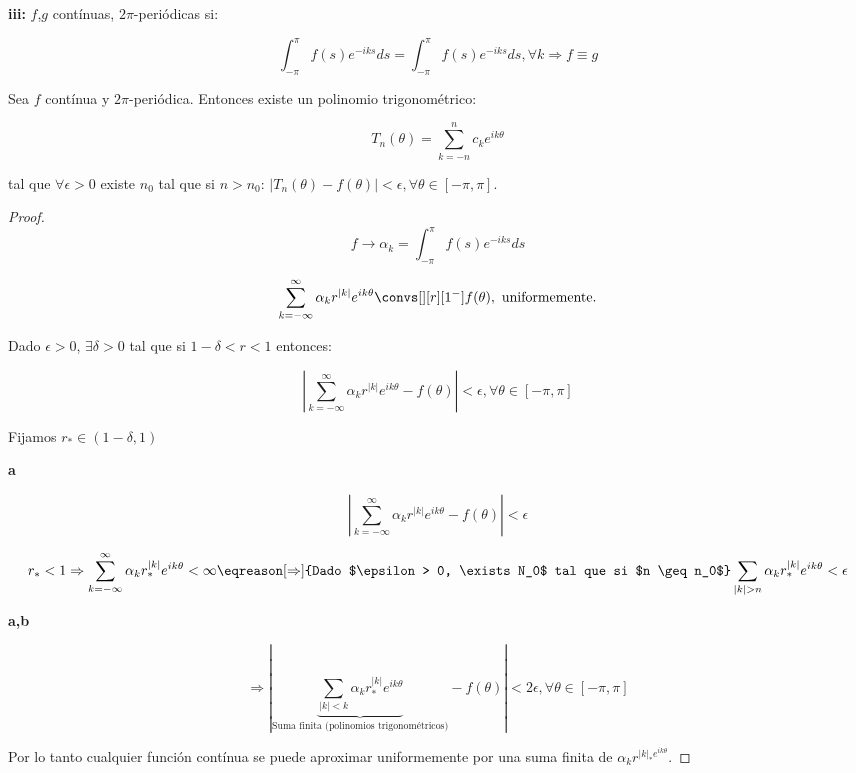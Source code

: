 		\textbf{iii:} $f$,$g$ contínuas, $2\pi$-periódicas si:

		\[ \int_{-\pi}^{\pi} f(s) e^{-iks}ds =
		 \int_{-\pi}^{\pi} f(s) e^{-iks}ds,  \forall k \Rightarrow f \equiv g \]

		\begin{theorem} \label{thm:AproxWeierstrass1} Sea $f$ contínua y $2\pi$-periódica. Entonces existe un polinomio trigonométrico:

		\[T_n (\theta) = \sum_{k = -n}^n c_k e^{ik\theta} \]

		tal que $\forall \epsilon > 0$ existe $n_0$ tal que si $n > n_0$: $|T_n (\theta) - f(\theta)| < \epsilon, \forall \theta \in [-\pi,\pi]$.
		\end{theorem}

		\begin{proof}

			\[f \rightarrow \alpha_k = \int_{-\pi}^\pi f(s) e^{-iks} ds  \]

			\[ \sum_{k=-\infty}^{\infty} \alpha_k r^{|k|} e^{ik\theta} \convs[][r][1^-] f(\theta), \text{ uniformemente.} \]

			Dado $\epsilon > 0$, $\exists \delta > 0$ tal que si $1-\delta < r < 1$ entonces:

			\[ \left| \sum_{k=-\infty}^{\infty} \alpha_k r^{|k|} e^{ik\theta} - f(\theta) \right| < \epsilon, \forall \theta \in [-\pi,\pi]  \]

			Fijamos $r_{*} \in (1-\delta, 1)$

			\textbf{a}

			\[ \left| \sum_{k=-\infty}^{\infty} \alpha_k r^{|k|} e^{ik\theta} - f(\theta) \right| < \epsilon \]

			\[  r_* < 1 \Rightarrow \sum_{k=-\infty}^\infty \alpha_k r_*^{|k|} e^{ik\theta} < \infty \eqreason[\Rightarrow]{Dado $\epsilon > 0, \exists N_0$ tal que si $n \geq n_0$} \sum_{|k| > n} \alpha_k r_*^{|k|} e^{ik\theta} < \epsilon \]

			\textbf{a,b}

			\[ \Rightarrow  \left| \underbrace{\sum_{|k| < k} \alpha_k r_*^{|k|} e^{ik\theta}}_{\text{Suma finita (polinomios trigonométricos)}} - f(\theta) \right| < 2 \epsilon, \forall \theta \in [-\pi,\pi] \]

			Por lo tanto cualquier función contínua se puede aproximar uniformemente por una suma finita de $\alpha_k r^{|k|_* e^{ik\theta}}$.

		\end{proof}

